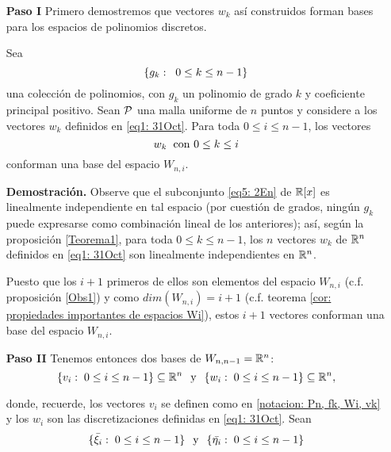 \begin{itemize}
\item[\textbf{Paso I}] 
Primero demostremos que vectores $w_{k}$ así
construidos forman bases para los espacios
de polinomios discretos.
\begin{prop}
\label{prop: los wk forman bases de los Wnk}
Sea 
\begin{equation}
\label{eq5: 2En}
\{g_{k}: \hspace{0.2cm} 0 \leq k \leq n-1 \} 
\end{equation}
una colección
de polinomios, con $g_{k}$ un polinomio de grado $k$ y coeficiente 
principal positivo. Sean 
$\mathcal{P}$ una malla uniforme de $n$ puntos y 
considere a los vectores $w_{k}$ 
definidos en \eqref{eq1: 31Oct}.
Para toda $0 \leq i \leq n-1$, los vectores
\[
w_{k} \hspace{0.2cm} \text{con } 0 \leq k \leq i
\]
conforman una base del espacio $W_{n,i}$.
\end{prop}
\noindent
\textbf{Demostración.}
Observe que el subconjunto \eqref{eq5: 2En}
de $\mathbb{R}[x]$
es linealmente independiente 
en tal espacio (por cuestión de grados,
ningún $g_{k}$ puede expresarse como combinación lineal de
los anteriores); así, según 
la proposición \ref{Teorema1},
para toda $0 \leq k \leq n-1$, los $n$ vectores $w_{k}$
de $\mathbb{R}^{n}$ 
definidos en 
\eqref{eq1: 31Oct}
son linealmente independientes en $\mathbb{R}^{n}$.

Puesto que
los $i+1$ primeros de ellos son elementos del 
espacio $W_{n,i}$
(c.f. proposición \ref{Obs1}) y 
como $dim(W_{n,i})=i+1$
(c.f. teorema \ref{cor: propiedades importantes de espacios Wi}), 
estos $i+1$ vectores conforman
una base del espacio $W_{n,i}$.
\QEDB
\vspace{0.2cm}


\item[\textbf{Paso II}] 
Tenemos entonces dos bases de 
$W_{n,n-1}=\mathbb{R}^{n}$:
\begin{equation}
\label{eq2: 31Oct}
\{v_{i} : \hspace{0.1cm} 0 \leq i \leq n-1 \} \subseteq \mathbb{R}^{n}
\hspace{0.25cm} \text{y} \hspace{0.25cm}
\{w_{i} : \hspace{0.1cm}  0 \leq i \leq n-1 \}\subseteq \mathbb{R}^{n},
\end{equation}

donde, recuerde, los vectores $v_{i}$ se definen como en
\ref{notacion: Pn, fk, Wi, vk}
y los $w_{i}$ son las discretizaciones definidas en
\eqref{eq1: 31Oct}.
Sean
\begin{equation}
\label{eq3: 31Oct}
\{\bar{\xi_{i}}: \hspace{0.1cm}  0 \leq i \leq n-1 \}
\hspace{0.25cm} \text{y} \hspace{0.25cm}
\{\bar{\eta_{i}}: \hspace{0.1cm}  0 \leq i \leq n-1 \}
\end{equation}


\end{itemize}
